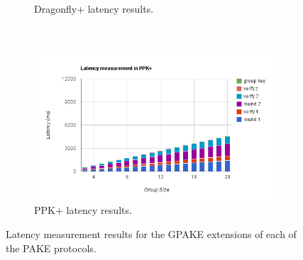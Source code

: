 \begin{figure}[h]
\begin{subfigure}[b]{0.5\textwidth}
        \caption{Dragonfly+ latency results.}
        \label{fig:dragon_results}
    \end{subfigure}
    ~
    \begin{subfigure}[b]{0.5\textwidth}
        \centering
        \includegraphics[width=\textwidth]{benchmark/scale_ppk.png}
        \caption{PPK+ latency results.}
        \label{fig:ppk_results}
    \end{subfigure}
    \caption{Latency measurement results for the GPAKE extensions of each of the PAKE protocols.}
    \label{fig:results}
\end{figure}


